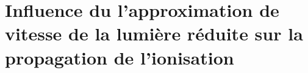 \chapter{Influence du l'approximation de vitesse de la lumière réduite sur la propagation de l'ionisation}
\label{sec:intre:zreio}








